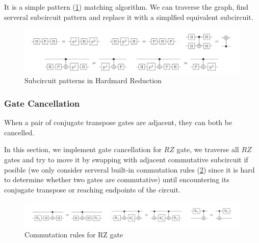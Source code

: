     It is a simple pattern (\ref{pattern}) matching algorithm. We can traverse the graph, find serveral subcircuit pattern and replace it with a simplfied equivalent subcircuit.


    \begin{center}
        \begin{figure}
            \label{pattern}
            \centering
            \includegraphics[width=0.9\linewidth]{images/hardmard_reduction.png}
            \caption{Subcircuit patterns in Hardmard Reduction}
        \end{figure}
    \end{center}

    \subsubsection{Gate Cancellation}
    When a pair of conjugate transpose gates are adjacent, they can both be cancelled.

    In this section, we implement gate cancellation for $RZ$ gate, we traverse all $RZ$ gates and try to move it by swapping with adjacent commutative subcircuit if posible (we only consider serveral  built-in commutation rules (\ref{commutation}) since it is hard to determine whether two gates are commutative) until encountering its conjugate transpose or reaching endpoints of the circuit.

    \begin{center}
        \begin{figure}
            \label{commutation}
            \centering
            \includegraphics[width=0.9\linewidth]{images/gate_cancellation.png}
            \caption{Commutation rules for RZ gate}
        \end{figure}
    \end{center}

